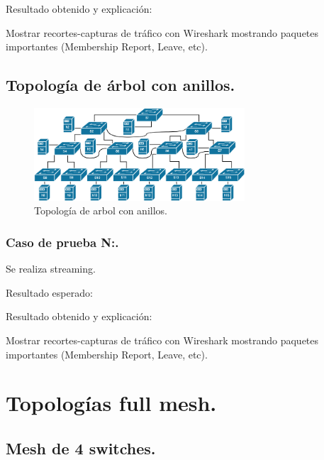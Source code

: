 \documentclass[12pt,a4paper,oneside]{book}
\begin{document}
\vspace{0.5cm}
Resultado obtenido y explicación: 

\vspace{0.5cm}
Mostrar recortes-capturas de tráfico con Wireshark mostrando paquetes importantes (Membership Report, Leave, etc).

\subsection{Topología de árbol con anillos.}

\begin{figure}[ht]
 \centering
 \includegraphics[width=0.7\textwidth]{fotos/5_Pruebas/3_topo_anillo/arbol_anillo.png}
 \caption{Topología de arbol con anillos.}
 \label{arbol_anillos}
\end{figure}

\subsubsection{Caso de prueba N:.} 
Se realiza streaming.

\vspace{0.5cm}
Resultado esperado: 

\vspace{0.5cm}
Resultado obtenido y explicación: 

\vspace{0.5cm}
Mostrar recortes-capturas de tráfico con Wireshark mostrando paquetes importantes (Membership Report, Leave, etc).


\section{Topologías full mesh.}

\subsection{Mesh de 4 switches.}
\end{document}
